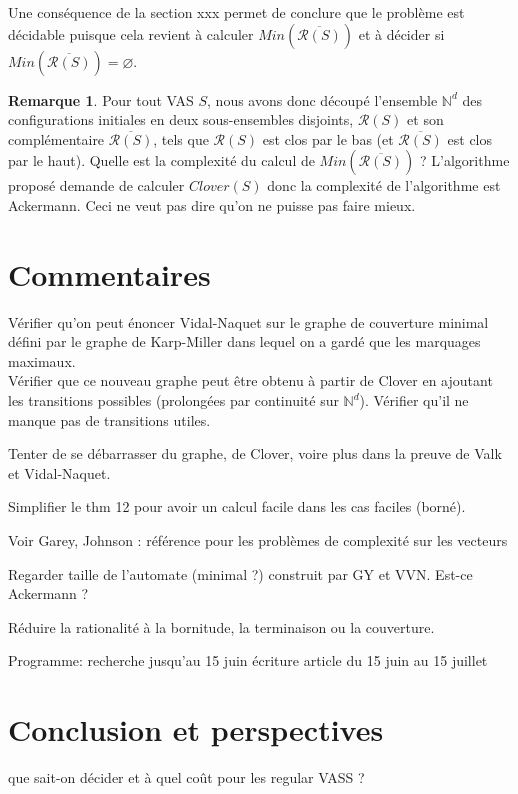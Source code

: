 \documentclass[a4paper,final]{article}
\theoremstyle{definition}
\newtheorem*{Remark}{Remarque}
\let\vide\varnothing
\newcommand{\Min}{\textit{Min}}
\newcommand{\N}{\ensuremath{\mathbb{N}}}
\newcommand{\clover}{\textit{Clover}}
\newcommand{\inirat}{\mathcal{R}}
\begin{document}
Une conséquence de la section xxx permet de conclure que le problème est décidable puisque cela revient à calculer $\Min(\overline{\inirat(S)})$ et à décider si $\Min(\overline{\inirat(S)})=\vide$.

\begin{Remark}
Pour tout VAS $S$, nous avons donc découpé l'ensemble $\N^d$ des configurations initiales en deux sous-ensembles disjoints, $\inirat(S)$ et son complémentaire $\overline{\inirat(S)}$, tels que $\inirat(S)$ est clos par le bas (et $\overline{\inirat(S)}$ est clos par le haut).
Quelle est la complexité du calcul de $\Min(\overline{\inirat(S)})$ ? L'algorithme proposé demande de calculer $\clover(S)$ donc la complexité de l'algorithme est Ackermann. Ceci ne veut pas dire qu'on ne puisse pas faire mieux. 
\end{Remark}


\section{Commentaires}
Vérifier qu'on peut énoncer Vidal-Naquet sur le graphe de couverture minimal défini par le graphe de Karp-Miller dans lequel on a gardé que les marquages maximaux.\\
Vérifier que ce nouveau graphe peut être obtenu à partir de Clover en ajoutant les transitions possibles (prolongées par continuité sur $\N^d$). Vérifier qu'il ne manque pas de transitions utiles.

Tenter de se débarrasser du graphe, de Clover, voire plus dans la preuve de Valk et Vidal-Naquet.

Simplifier le thm 12 pour avoir un calcul facile dans les cas faciles (borné).

Voir Garey, Johnson : référence pour les problèmes de complexité sur les vecteurs

Regarder taille de l'automate (minimal ?) construit par GY et VVN. Est-ce Ackermann ?

Réduire la rationalité à la bornitude, la terminaison ou la couverture.

Programme:
recherche jusqu'au 15 juin
écriture article du 15 juin au 15 juillet \\

\section{Conclusion et perspectives}
que sait-on décider et à quel coût pour les regular VASS ?
\end{document}
